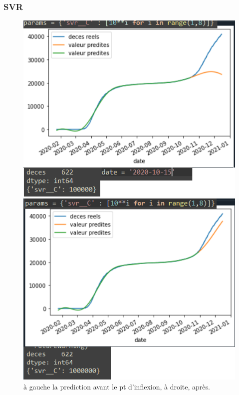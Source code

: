 \documentclass{beamer}
\begin{document}
\begin{frame}
	\frametitle{SVR}
	\begin{figure}[t]
		\centering
		\begin{minipage}{0.5\textwidth}
			\includegraphics[scale=0.25]{SVR_avant_pt_dinflexion}
		\end{minipage}%
		\begin{minipage}{0.5\textwidth}
			\includegraphics[scale=0.25]{SVR_apres_pt_dinflexion}
		\end{minipage}
	\caption{à gauche la prediction avant le pt d'inflexion, à droite, après.}
	\end{figure}
\end{frame}
\end{document}
